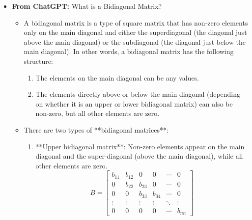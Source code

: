 \documentclass[11.5pt,a4paper]{article}
\begin{document}
\begin{itemize}
\begin{itemize}
\begin{itemize}
\begin{itemize}
                \textit{\textbf{Note:} In the context of matrices, orthogonal and orthonormal are often used interchangeably when referring to the columns (or rows) of a matrix, especially in real space. This is because, for a square matrix, if its columns (or rows) are orthogonal, they are often assumed to be of unit length as well, making them orthonormal.}\newline
                \item \( R \) is an upper triangular matrix, where all elements below the diagonal are zero.
            \end{itemize}
            QR factorization is useful in various applications such as solving linear systems, least squares problems, and eigenvalue problems. The QR factorization can be found using Gram-Schmidt, Householder transformations, or Givens rotations.
        \end{itemize}
        \item \textbf{From ChatGPT:} What is a Bidiagonal Matrix?
        \begin{itemize}
            \item A bidiagonal matrix is a type of square matrix that has non-zero elements only on the main diagonal and either the superdiagonal (the diagonal just above the main diagonal) or the subdiagonal (the diagonal just below the main diagonal). In other words, a bidiagonal matrix has the following structure:
            \begin{enumerate}
                \item The elements on the main diagonal can be any values.
                \item The elements directly above or below the main diagonal (depending on whether it is an upper or lower bidiagonal matrix) can also be non-zero, but all other elements are zero.
            \end{enumerate}

            \item There are two types of **bidiagonal matrices**:
            \begin{enumerate}
                \item **Upper bidiagonal matrix**: Non-zero elements appear on the main diagonal and the super-diagonal (above the main diagonal), while all other elements are zero.
               \[
               B = \begin{bmatrix}
               b_{11} & b_{12} & 0 & 0 & \cdots & 0 \\
               0 & b_{22} & b_{23} & 0 & \cdots & 0 \\
               0 & 0 & b_{33} & b_{34} & \cdots & 0 \\
               \vdots & \vdots & \vdots & \vdots & \ddots & \vdots \\
               0 & 0 & 0 & 0 & \cdots & b_{nn}
               \end{bmatrix}
               \]
               

\end{enumerate}
\end{itemize}
\end{itemize}
\end{itemize}
\end{document}
